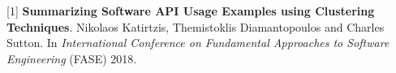 

\begin{cventries}


  \cventry
    {} %
    {} %
    {} %
    {} %
    {[1] \textbf{Summarizing Software API Usage Examples using Clustering Techniques}. Nikolaos Katirtzis, Themistoklis Diamantopoulos and Charles Sutton. In \textit{International Conference on Fundamental Approaches to Software Engineering} (FASE) 2018.
    }
\end{cventries}
